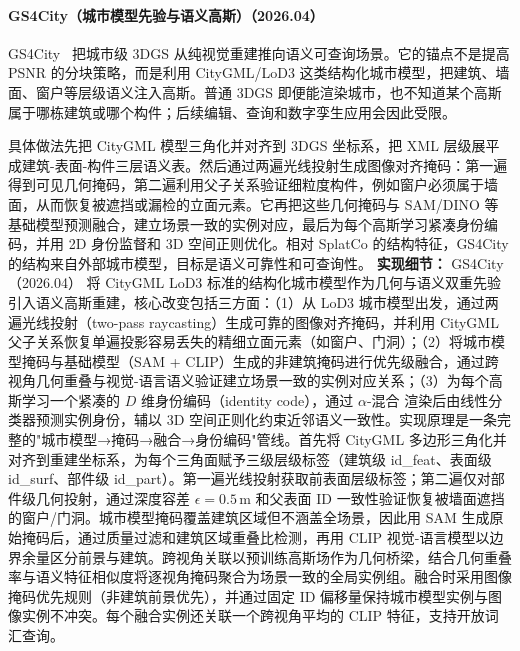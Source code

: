 \paragraph{GS4City（城市模型先验与语义高斯）（2026.04）}
GS4City~\cite{2604_11401} 把城市级 3DGS 从纯视觉重建推向语义可查询场景。它的锚点不是提高 PSNR 的分块策略，而是利用 CityGML/LoD3 这类结构化城市模型，把建筑、墙面、窗户等层级语义注入高斯。普通 3DGS 即便能渲染城市，也不知道某个高斯属于哪栋建筑或哪个构件；后续编辑、查询和数字孪生应用会因此受限。

具体做法先把 CityGML 模型三角化并对齐到 3DGS 坐标系，把 XML 层级展平成建筑-表面-构件三层语义表。然后通过两遍光线投射生成图像对齐掩码：第一遍得到可见几何掩码，第二遍利用父子关系验证细粒度构件，例如窗户必须属于墙面，从而恢复被遮挡或漏检的立面元素。它再把这些几何掩码与 SAM/DINO 等基础模型预测融合，建立场景一致的实例对应，最后为每个高斯学习紧凑身份编码，并用 2D 身份监督和 3D 空间正则优化。相对 SplatCo 的结构特征，GS4City 的结构来自外部城市模型，目标是语义可靠性和可查询性。
\textbf{实现细节：} GS4City（2026.04） 将 CityGML LoD3 标准的结构化城市模型作为几何与语义双重先验引入语义高斯重建，核心改变包括三方面：（1）从 LoD3 城市模型出发，通过两遍光线投射（two-pass raycasting）生成可靠的图像对齐掩码，并利用 CityGML 父子关系恢复单遍投影容易丢失的精细立面元素（如窗户、门洞）；（2）将城市模型掩码与基础模型（SAM + CLIP）生成的非建筑掩码进行优先级融合，通过跨视角几何重叠与视觉-语言语义验证建立场景一致的实例对应关系；（3）为每个高斯学习一个紧凑的 $D$ 维身份编码（identity code），通过 $\alpha$-混合 渲染后由线性分类器预测实例身份，辅以 3D 空间正则化约束近邻语义一致性。实现原理是一条完整的"城市模型→掩码→融合→身份编码"管线。首先将 CityGML 多边形三角化并对齐到重建坐标系，为每个三角面赋予三级层级标签（建筑级 id\_feat、表面级 id\_surf、部件级 id\_part）。第一遍光线投射获取前表面层级标签；第二遍仅对部件级几何投射，通过深度容差 $\epsilon=0.5$\,m 和父表面 ID 一致性验证恢复被墙面遮挡的窗户/门洞。城市模型掩码覆盖建筑区域但不涵盖全场景，因此用 SAM 生成原始掩码后，通过质量过滤和建筑区域重叠比检测，再用 CLIP 视觉-语言模型以边界余量区分前景与建筑。跨视角关联以预训练高斯场作为几何桥梁，结合几何重叠率与语义特征相似度将逐视角掩码聚合为场景一致的全局实例组。融合时采用图像掩码优先规则（非建筑前景优先），并通过固定 ID 偏移量保持城市模型实例与图像实例不冲突。每个融合实例还关联一个跨视角平均的 CLIP 特征，支持开放词汇查询。
